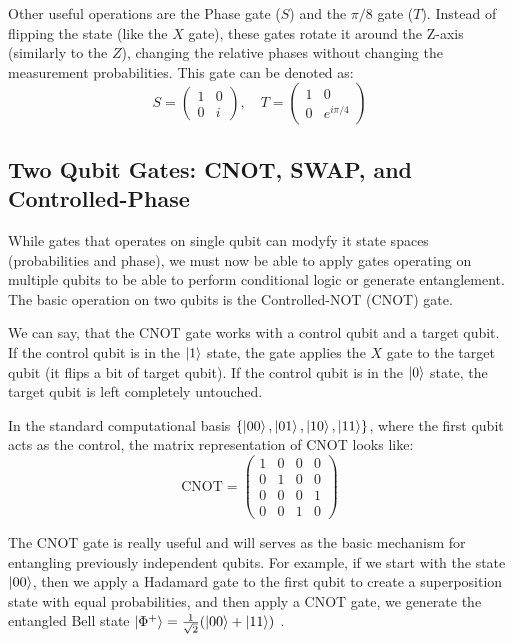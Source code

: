 %
%
Other useful operations are the Phase gate ($S$) and the $\pi/8$ gate ($T$).
Instead of flipping the state (like the $X$ gate), these gates rotate it around the Z-axis (similarly to the $Z$), 
changing the relative phases without changing the measurement probabilities. 
%
%
This gate can be denoted as:
\bigskip
\begin{equation}
    S = \begin{pmatrix} 1 & 0 \\ 0 & i \end{pmatrix}, \quad T = \begin{pmatrix} 1 & 0 \\ 0 & e^{i\pi/4} \end{pmatrix}
\end{equation}
\bigskip
%
%
\subsection{Two Qubit Gates: CNOT, SWAP, and Controlled-Phase}
While gates that operates on single qubit can modyfy it state spaces (probabilities and phase), 
we must now be able to apply gates operating on multiple qubits to be able to perform conditional logic or generate entanglement.
%
%
The basic operation on two qubits is the Controlled-NOT (CNOT) gate.
%
%

We can say, that the CNOT gate works with a control qubit and a target qubit.
If the control qubit is in the $\ket{1}$ state, the gate applies the $X$ gate to the target qubit (it flips a bit of target qubit).
If the control qubit is in the $\ket{0}$ state, the target qubit is left completely untouched.

%
%
In the standard computational basis $\{\ket{00}, \ket{01}, \ket{10}, \ket{11}\}$, 
where the first qubit acts as the control, the matrix representation of CNOT looks like:
%
%
\bigskip
\begin{equation}
    \text{CNOT} = \begin{pmatrix} 
    1 & 0 & 0 & 0 \\ 
    0 & 1 & 0 & 0 \\ 
    0 & 0 & 0 & 1 \\ 
    0 & 0 & 1 & 0 
    \end{pmatrix}
\end{equation}
\bigskip

The CNOT gate is really useful and will serves as the basic mechanism for entangling previously independent qubits.
For example, if we start with the state $\ket{00}$, 
then we apply a Hadamard gate to the first qubit to create a superposition state with equal probabilities, 
and then apply a CNOT gate, 
we generate the entangled Bell state $\ket{\Phi^+} = \frac{1}{\sqrt{2}}(\ket{00} + \ket{11})$ \cite{nielsen2010quantum}.


